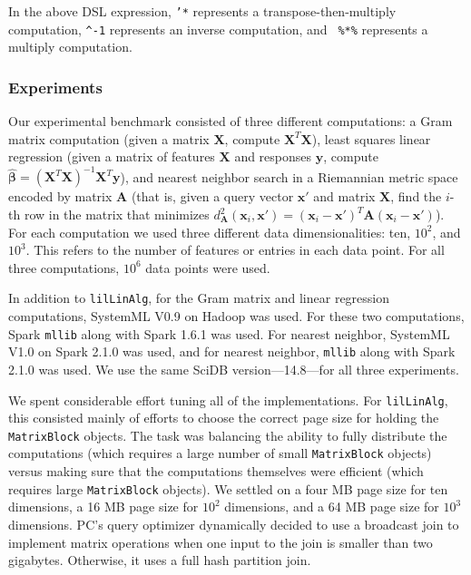 \noindent In the above DSL expression, \texttt{'*} represents a transpose-then-multiply computation,
\texttt{\^{}-1} represents an inverse computation, and \texttt{ \%*\%}
represents a multiply computation. 

\subsubsection {Experiments}

Our experimental benchmark consisted of three different computations:
a Gram matrix computation (given a matrix $\textbf{X}$, compute
$\textbf{X}^T \textbf{X}$), least squares linear regression (given a matrix of features $\textbf{X}$ and
responses $\textbf{y}$, compute 
$\hat{\pmb{\beta}} = (\textbf{X}^{T} \textbf{X})^{-1} \textbf{X}^{T} \textbf{y}$), and nearest
neighbor search in a Riemannian metric space \cite{lebanon2006metric} encoded by matrix $\textbf{A}$ (that is,
given a query vector
$\textbf{x}'$ and matrix $\textbf{X}$, find the $i$-th row in the matrix that minimizes 
$d_{\textbf{A}}^2(\textbf{x}_i, \textbf{x}') = 
(\textbf{x}_i - \textbf{x}')^T\textbf{A}(\textbf{x}_i - \textbf{x}')$).  
For each computation we used three different data dimensionalities: ten, $10^2$, and $10^3$.  This refers to
the number of features or entries in each data point. 
For
all three computations, 
$10^6$ data points were used. 

In addition to \texttt{lilLinAlg}, 
for the Gram matrix and linear regression computations, SystemML V0.9 on Hadoop was used.
For these two computations, Spark \texttt{mllib} along with
Spark 1.6.1 was used.  For
nearest neighbor, SystemML V1.0 on Spark 2.1.0 was used, and for
nearest neighbor, \texttt{mllib} along with Spark 2.1.0 was used. We
use the same SciDB version---14.8---for all three
experiments.

We spent considerable effort tuning all of the implementations.
For \texttt{lilLinAlg}, this consisted mainly of efforts to choose the correct page size for holding the
\texttt{MatrixBlock} objects.  The task was balancing the ability to fully distribute the computations
(which requires a large number of small \texttt{MatrixBlock} objects) versus making sure that the computations
themselves were efficient (which requires large \texttt{MatrixBlock} objects).  We settled on 
a four MB page size for ten dimensions, a 16 MB page
size for $10^2$ dimensions, and a 64 MB page size for $10^3$ dimensions. 
PC's query optimizer dynamically decided to use a
broadcast join to implement matrix operations when one input to the join is smaller than 
two
gigabytes.  Otherwise, it uses a full hash partition join.

